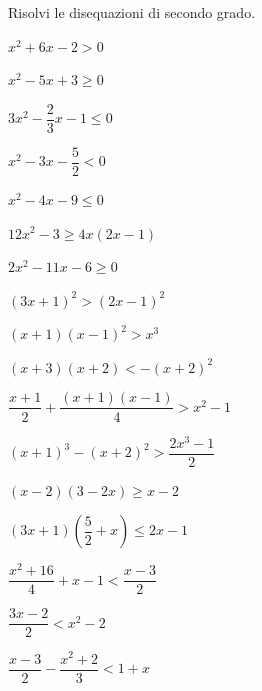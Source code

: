 \begin{esercizio}[*]
\label{ese:4.17}
Risolvi le disequazioni di secondo grado.
% 
\begin{enumeratees}
\item \(x^2+6x-2>0\) 
\item \(x^2-5x+3 \geqslant 0\)
\item \(3x^2-\dfrac 2 3x-1 \leqslant 0\) 
\item \(x^2-3x-\dfrac 5 2<0\) 
\item \(x^2-4x-9 \leqslant 0\) 
\item \(12x^2-3 \geqslant 4x(2x-1)\) 
\item \(2x^2-11x-6 \geqslant 0\) 
\item \((3x+1)^2>(2x-1)^2\) 
\item \((x+1)(x-1)^2>x^3\) 
\item \((x+3)(x+2)<-(x+2)^2\)
\item \(\dfrac{x+1} 2+\dfrac{(x+1)(x-1)} 4>x^2-1\)
\item \((x+1)^3-(x+2)^2>\dfrac{2x^3-1} 2\)
\item \((x-2)(3-2x) \geqslant x-2\)
\item \((3x+1)\left(\dfrac 5 2+x\right) \leqslant 2x-1\)
\item \(\dfrac{x^2+16} 4+x-1<\dfrac{x-3} 2\)
\sol{\emptyset}
\item \(\dfrac{3x-2} 2<x^2-2\)
\item \(\dfrac{x-3} 2-\dfrac{x^2+2} 3<1+x\)
\sol{\R}
\end{enumeratees}
\end{esercizio}

